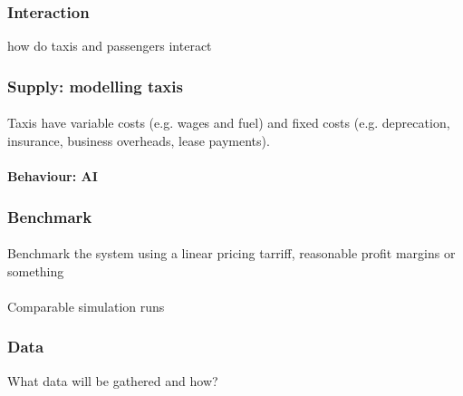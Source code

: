 \subsubsection{Interaction} how do taxis and passengers interact

\subsubsection{Supply: modelling taxis} 

\paragraph{} Taxis have variable costs (e.g. wages and fuel) and fixed costs
(e.g. deprecation, insurance, business overheads, lease payments). 

\paragraph{Behaviour: AI}

\subsubsection{Benchmark} 

\paragraph{} Benchmark the system using a linear pricing tarriff,
reasonable profit margins or something

\paragraph{} Comparable simulation runs

\subsubsection{Data} What data will be gathered and how?
